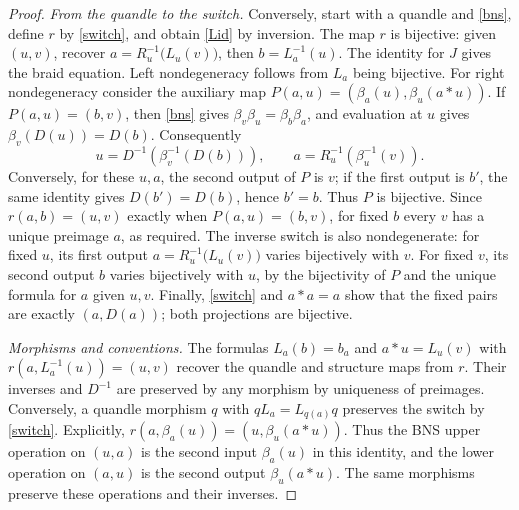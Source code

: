 \documentclass[11pt,a4paper]{article}
\begin{document}
\begin{proof}
\emph{From the quandle to the switch.} Conversely, start with a quandle and \eqref{bns}, define $r$ by \eqref{switch}, and obtain \eqref{Lid} by inversion. The map $r$ is bijective: given $(u,v)$, recover $a=R_u^{-1}\bigl(L_u(v)\bigr)$, then $b=L_a^{-1}(u)$. The identity for $J$ gives the braid equation. Left nondegeneracy follows from $L_a$ being bijective. For right nondegeneracy consider the auxiliary map $P(a,u)=(\beta_a(u),\beta_u(a*u))$. If $P(a,u)=(b,v)$, then \eqref{bns} gives $\beta_v\beta_u=\beta_b\beta_a$, and evaluation at $u$ gives $\beta_v(D(u))=D(b)$. Consequently
\[
u=D^{-1}(\beta_v^{-1}(D(b))),\qquad
 a=R_u^{-1}(\beta_u^{-1}(v)).
\]
Conversely, for these $u,a$, the second output of $P$ is $v$; if the first output is $b'$, the same identity gives $D(b')=D(b)$, hence $b'=b$. Thus $P$ is bijective. Since $r(a,b)=(u,v)$ exactly when $P(a,u)=(b,v)$, for fixed $b$ every $v$ has a unique preimage $a$, as required. The inverse switch is also nondegenerate: for fixed $u$, its first output $a=R_u^{-1}\bigl(L_u(v)\bigr)$ varies bijectively with $v$. For fixed $v$, its second output $b$ varies bijectively with $u$, by the bijectivity of $P$ and the unique formula for $a$ given $u,v$. Finally, \eqref{switch} and $a*a=a$ show that the fixed pairs are exactly $(a,D(a))$; both projections are bijective.

\emph{Morphisms and conventions.} The formulas $L_a(b)=b_a$ and $a*u=L_u(v)$ with $r(a,L_a^{-1}(u))=(u,v)$ recover the quandle and structure maps from $r$. Their inverses and $D^{-1}$ are preserved by any morphism by uniqueness of preimages. Conversely, a quandle morphism $q$ with $qL_a=L_{q(a)}q$ preserves the switch by \eqref{switch}. Explicitly, $r(a,\beta_a(u))=(u,\beta_u(a*u))$. Thus the BNS upper operation on $(u,a)$ is the second input $\beta_a(u)$ in this identity, and the lower operation on $(a,u)$ is the second output $\beta_u(a*u)$. The same morphisms preserve these operations and their inverses.
\end{proof}
\end{document}
